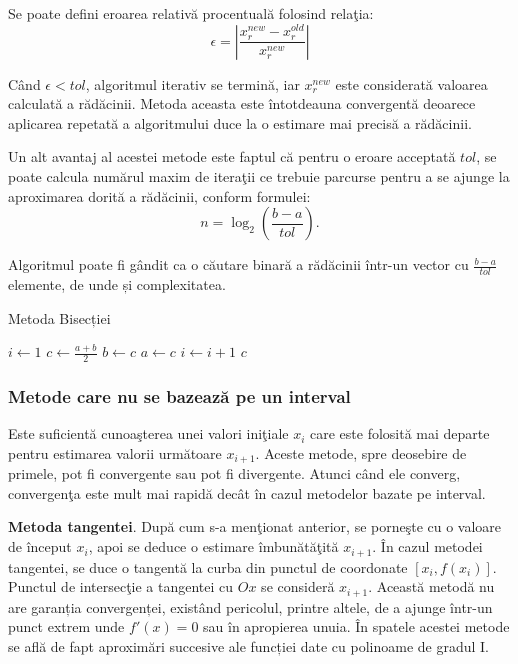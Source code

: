 \documentclass{exam}
\begin{document}
Se poate defini eroarea relativă procentuală folosind relaţia:
$$\epsilon=\left | \frac{x_{r}^{new}-x_{r}^{old}}{x_{r}^{new}} \right |$$

Când $\epsilon < tol$, algoritmul iterativ se termină, iar $x_{r}^{new}$ este considerată valoarea calculată a rădăcinii. Metoda aceasta este întotdeauna convergentă deoarece aplicarea repetată a algoritmului duce la o estimare mai precisă a rădăcinii.

Un alt avantaj al acestei metode este faptul că pentru o eroare acceptată $tol$, se poate calcula numărul maxim de iteraţii ce trebuie parcurse pentru a se ajunge la aproximarea dorită a rădăcinii, conform formulei:
$$n=\log_{2}(\frac{b-a}{tol}).$$

Algoritmul poate fi gândit ca o căutare binară a rădăcinii într-un vector cu $\frac{b-a}{tol}$ elemente, de unde și complexitatea.
    
\begin{algorithm}[H]
    \caption{Metoda Bisecției}
    \begin{algorithmic}[1]
        \State $i \gets 1$
            \State $c \gets \frac{a + b}{2}$
                \State $b \gets c$
            \Else
                \State $a \gets c$
            \EndIf
            \State $i \gets i + 1$
        \EndWhile
        \State \Return $c$
    \end{algorithmic}
\end{algorithm}

\subsubsection{Metode care nu se bazează pe un interval}

Este suficientă cunoaşterea unei valori iniţiale $x_i$ care este folosită mai departe pentru estimarea valorii următoare $x_{i+1}$. Aceste metode, spre deosebire de primele, pot fi convergente sau pot fi divergente. Atunci când ele converg, convergenţa este mult mai rapidă decât în cazul metodelor bazate pe interval.

\textbf{Metoda tangentei}. După cum s-a menţionat anterior, se porneşte cu o valoare de început $x_{i}$, apoi se deduce o estimare îmbunătăţită $x_{i+1}$. În cazul metodei tangentei, se duce o tangentă la curba din punctul de coordonate $[x_{i}, f(x_{i})]$. Punctul de intersecţie a tangentei cu $Ox$ se consideră  $x_{i+1}$. Această metodă nu are garanția convergenței, existând pericolul, printre altele, de a ajunge într-un punct extrem unde $f'(x) = 0$ sau în apropierea unuia. În spatele acestei metode se află de fapt aproximări succesive ale funcției date cu polinoame de gradul I.
\end{document}
